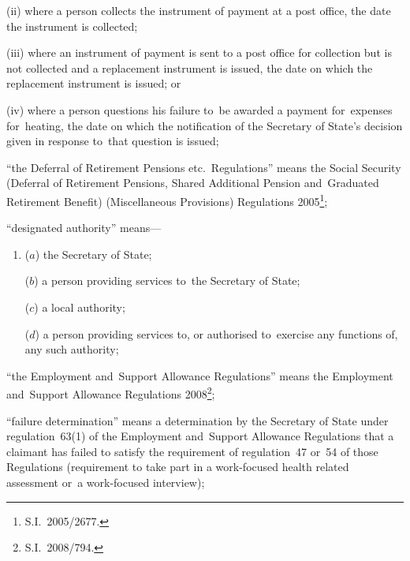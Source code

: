 \documentclass[12pt,a4paper]{article}
\begin{document}
\begin{enumerate}
\begin{enumerate}
\begin{enumerate}
(ii) where a person collects the instrument of payment at a post office, the date the instrument is collected;

(iii) where an instrument of payment is sent to a post office for collection but is not collected and a replacement instrument is issued, the date on which the replacement instrument is issued; or

(iv) where a person questions his failure to~be awarded a payment for~expenses for~heating, the date on which the notification of the Secretary of State’s decision given in response to~that question is issued;
\end{enumerate}
\end{enumerate}

\enlargethispage{\baselineskip}

“the Deferral of Retirement Pensions etc.\ Regulations” means the Social Security (Deferral of Retirement Pensions, Shared Additional Pension and~Graduated Retirement Benefit) (Miscellaneous Provisions) Regulations 2005\footnote{S.I.~2005/2677.};


“designated authority” means—
\begin{enumerate}\item[]
    ($a$)     the Secretary of State;

    ($b$) 
    a person providing services to~the Secretary of State;

    ($c$) 
    a local authority;

    ($d$) 
    a person providing services to, or authorised to~exercise any functions of, any such authority;
\end{enumerate}

“the Employment and~Support Allowance Regulations” means the Employment and~Support Allowance Regulations 2008\footnote{S.I.~2008/794.};

“failure determination” means a determination by the Secretary of State under regulation~63(1) of the Employment and~Support Allowance Regulations that a claimant has failed to satisfy the requirement of regulation~47 or~54 of those Regulations (requirement to take part in a work-focused health related assessment or~a work-focused interview);


\end{enumerate}
\end{document}
